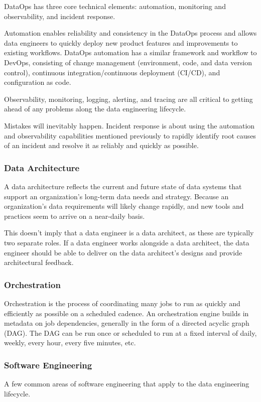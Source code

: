 \documentclass[12pt]{book}
\begin{document}
DataOps has three core technical elements: automation, monitoring and observability, and incident response.

Automation enables reliability and consistency in the DataOps process and allows data engineers to quickly deploy new product features and improvements to existing workflows. DataOps automation has a similar framework and workflow to DevOps, consisting of change management (environment, code, and data version control), continuous integration/continuous deployment (CI/CD), and configuration as code.

Observability, monitoring, logging, alerting, and tracing are all critical to getting ahead of any problems along the data engineering lifecycle. 

Mistakes will inevitably happen. Incident response is about using the automation and observability capabilities mentioned previously to rapidly identify root causes of an incident and resolve it as reliably and quickly as possible.

\subsubsection{Data Architecture}
A data architecture reflects the current and future state of data systems that support an organization’s long-term data needs and strategy. Because an organization’s data requirements will likely change rapidly, and new tools and practices seem to arrive on a near-daily basis.

This doesn’t imply that a data engineer is a data architect, as these are typically two separate roles. If a data engineer works alongside a data architect, the data engineer should be able to deliver on the data architect’s designs and provide architectural feedback.
\subsubsection{Orchestration }
Orchestration is the process of coordinating many jobs to run as quickly and efficiently as possible on a scheduled cadence. An orchestration engine builds in metadata on job dependencies, generally in the form of a directed acyclic graph (DAG). The DAG can be run once or scheduled to run at a fixed interval of daily, weekly, every hour, every five minutes, etc. 

\subsubsection{Software Engineering}
A few common areas of software engineering that apply to the data engineering lifecycle.
\end{document}
